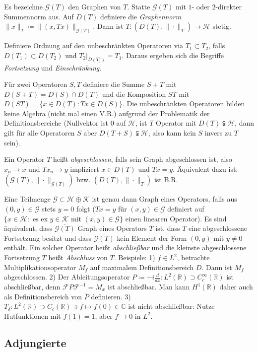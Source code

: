 \documentclass[11pt,a4paper]{scrartcl}
\newcommand{\R}{\mathbb{R}} %
\newcommand{\C}{\mathbb{C}} %
\newcommand{\Hc}{\mathcal{H}}
\newcommand{\Kc}{\mathcal{K}}
\newcommand{\G}{\mathcal{G}}
\newcommand{\F}{\mathcal{F}}
\theoremstyle{plain}
\theoremstyle{definition}
\theoremstyle{remark}
\begin{document}
Es bezeichne $\G(T)$ den Graphen von $T$. Statte $\G(T)$ mit $1$- oder $2$-direkter Summennorm aus. Auf $D(T)$ definiere die \emph{Graphennorm} $\|x\|_T \coloneqq \|(x,Tx)\|_{\G(T)}$. Dann ist $T: (D(T), \|\cdot\|_T) \to \Hc$ stetig.

Definiere Ordnung auf den unbeschränkten Operatoren via $T_1 \subset T_2$, falls $D(T_1)\subset D(T_2)$ und $T_2|_{D(T_1)} = T_1$. Daraus ergeben sich die Begriffe \emph{Fortsetzung} und \emph{Einschränkung}.

Für zwei Operatoren $S,T$ definiere die Summe $S+T$ mit $D(S+T)=D(S)\cap D(T)$ und die Komposition $ST$ mit $D(ST)=\{x\in D(T): Tx\in D(S)\}$. Die unbeschränkten Operatoren bilden keine Algebra (nicht mal einen V.R.) aufgrund der Problematik der Definitionsbereiche (Nullvektor ist $0$ auf $\Hc$, ist $T$ Operator mit $D(T)\subsetneqq \Hc$, dann gilt für alle Operatoren $S$ aber $D(T+S)\subsetneqq \Hc$, also kann kein $S$ invers zu $T$ sein).

Ein Operator $T$ heißt \emph{abgeschlossen}, falls sein Graph abgeschlossen ist, also $x_n\to x$ und $Tx_n\to y$ impliziert $x\in D(T)$ und $Tx=y$. Äquivalent dazu ist: $(\G(T),\|\cdot\|_{\G(T)})$ bzw. $(D(T), \|\cdot\|_T)$ ist B.R.

Eine Teilmenge $\G \subset \Hc \oplus \Kc$ ist genau dann Graph eines Operators, falls aus $(0,y)\in \G$ stets $y=0$ folgt ($Tx=y$ für $(x,y)\in \G$ definiert auf $\{x\in \Hc: \text{ es ex } y\in \Kc \text{ mit } (x,y)\in \G\}$ einen linearen Operator). Es sind äquivalent, dass $\overline{\G(T)}$ Graph eines Operators $\overline{T}$ ist, dass $T$ eine abgeschlossene Fortsetzung besitzt und dass $\overline{\G(T)}$ kein Element der Form $(0,y)$ mit $y\neq 0$ enthält. Ein solcher Operator heißt \emph{abschließbar} und die kleinste abgeschlossene Fortsetzung $\overline{T}$ heißt \emph{Abschluss} von $T$. Beispiele: 1) $f\in L^2$, betrachte Multiplikationsoperator $M_f$ auf maximalem Definitionsbereich $D$. Dann ist $M_f$ abgeschlossen. 2) Der Ableitungsoperator $P\coloneqq -i \frac{d}{dx}: L^2(\R) \supset C_c^\infty(\R)$ ist abschließbar, denn $\F P\F^{-1} = M_x$ ist abschließbar. Man kann $H^1(\R)$ daher auch als Definitionsbereich von $\overline{P}$ definieren. 3) $T_\delta: L^2(\R) \supset C_c(\R) \ni f \mapsto f(0) \in \C$ ist nicht abschließbar: Nutze Hutfunktionen mit $f(1)=1$, aber $f\to 0$ in $L^2$.

\subsection{Adjungierte}
\end{document}
